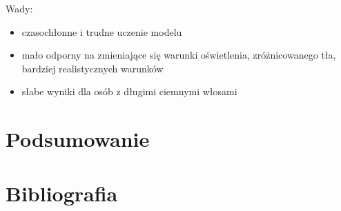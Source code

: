 \documentclass[11pt,a4paper]{article}
\begin{document}
\noindent 
Wady:
\begin{itemize}
\item  czasochłonne i trudne uczenie modelu 
\item  mało odporny na zmieniające się warunki oświetlenia, zróżnicowanego tła, bardziej realistycznych warunków
\item  słabe wyniki dla osób z długimi ciemnymi włosami
\end{itemize}

\section{Podsumowanie}

\section{Bibliografia}


\end{document}
